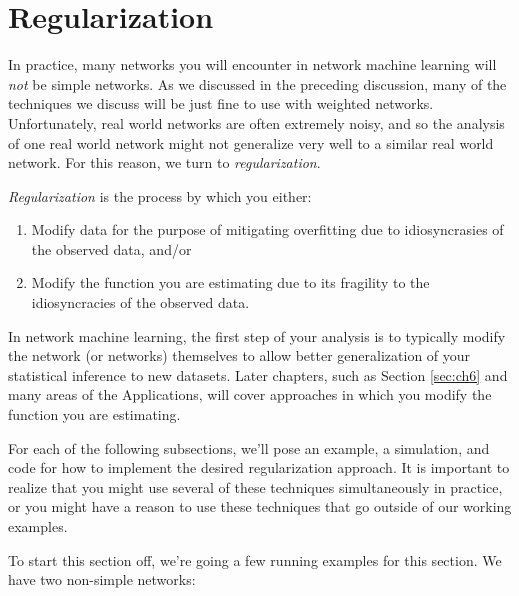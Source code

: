 \section{Regularization}
\label{sec:ch4:regularization}

In practice, many networks you will encounter in network machine learning will \emph{not} be simple networks. As we discussed in the preceding discussion, many of the techniques we discuss will be just fine to use with weighted networks. Unfortunately, real world networks are often extremely noisy, and so the analysis of one real world network might not generalize very well to a similar real world network. For this reason, we turn to \emph{regularization}. 

\textit{Regularization} is the process by which you either:
\begin{enumerate}
    \item Modify data for the purpose of mitigating overfitting due to idiosyncrasies of the observed data, and/or
    \item Modify the function you are estimating due to its fragility to the idiosyncracies of the observed data.
\end{enumerate}

In network machine learning, the first step of your analysis is to typically modify the network (or networks) themselves to allow better generalization of your statistical inference to new datasets. Later chapters, such as Section \ref{sec:ch6} and many areas of the Applications, will cover approaches in which you modify the function you are estimating.

For each of the following subsections, we'll pose an example, a simulation, and code for how to implement the desired regularization approach. It is important to realize that you might use several of these techniques simultaneously in practice, or you might have a reason to use these techniques that go outside of our working examples.

To start this section off, we're going a few running examples for this section. We have two non-simple networks:

